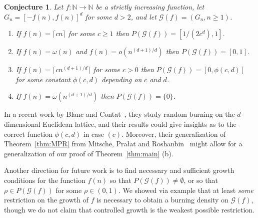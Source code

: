 \documentclass[12pt]{article}
\newtheorem{conjecture}[theorem]{Conjecture}
\theoremstyle{remark}
\providecommand{\N}{}
\renewcommand{\N}{{\mathbb N}}
\newcommand\cG{\mathcal G}
\begin{document}
\begin{conjecture}
Let $f : \N \to \N$ be a strictly increasing function, let $G_n = [-f(n),f(n)]^d$ for some $d>2$, and let $\cG(f) = (G_n,n \geq 1)$. 
\begin{enumerate}
\item[(a)] If $f(n) = \lceil cn \rceil$ for some $c \geq 1$ then $P(\cG(f)) = [1/(2c^d),1]$.
\item[(b)] If $f(n) = \omega(n)$ and $f(n) = o(n^{(d+1)/d})$ then $P(\cG(f)) = [0,1]$.
\item[(c)] If $f(n) = \lceil cn^{(d+1)/d} \rceil$ for some $c > 0$ then $P(\cG(f)) = [0,\phi(c,d)]$ for some constant $\phi(c,d)$ depending on $c$ and $d$.
\item[(d)] If $f(n) = \omega(n^{(d+1)/d})$ then $P(\cG(f)) = \{0\}$.  
\end{enumerate}
\end{conjecture}
\noindent
In a recent work by Blanc and Contat~\cite{BC25}, they study random burning on the $d$-dimensional Euclidean lattice, and their results could give insights as to the correct function $\phi(c, d)$ in case $(c)$. Moreover, their generalization of Theorem~\ref{thm:MPR} from Mitsche, Pra\l{}at and Roshanbin~\cite{MPR17} might allow for a generalization of our proof of Theorem~\ref{thm:main} (b). 

Another direction for future work is to find necessary and sufficient growth conditions for the function $f(n)$ so that $P(\cG(f)) \neq \emptyset$, or so that $\rho \in P(\cG(f))$ for some $\rho \in (0, 1)$. We showed via example that at least \textit{some} restriction on the growth of $f$ is necessary to obtain a burning density on $\cG(f)$, though we do not claim that controlled growth is the weakest possible restriction. 
\end{document}
